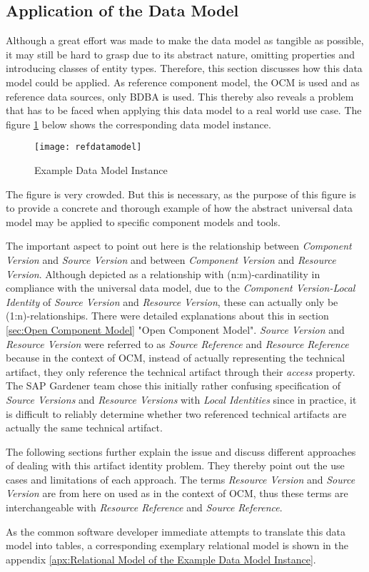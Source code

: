 \subsection{Application of the Data Model} \label{sec:Application of the Data Model}
Although a great effort was made to make the data model as tangible as possible, it may still be hard to grasp due to its abstract nature, omitting properties and introducing classes of entity types. Therefore, this section discusses how this data model could be applied. As reference component model, the OCM is used and as reference data sources, only BDBA is used. This thereby also reveals a problem that has to be faced when applying this data model to a real world use case. The figure \ref{fig:RefDataModel} below shows the corresponding data model instance.\par

\begin{figure}[H]
	\centering
	\texttt{[image: refdatamodel]}
	\caption[Data Model]{Example Data Model Instance }
	\label{fig:RefDataModel}
\end{figure}

The figure is very crowded. But this is necessary, as the purpose of this figure is to provide a concrete and thorough example of how the abstract universal data model may be applied to specific component models and tools.\par
The important aspect to point out here is the relationship between \emph{Component Version} and \emph{Source Version} and between \emph{Component Version} and \emph{Resource Version}. Although depicted as a relationship with (n:m)-cardinatility in compliance with the universal data model, due to the \emph{Component Version-Local Identity} of \emph{Source Version} and \emph{Resource Version}, these can actually only be (1:n)-relationships. There were detailed explanations about this in section \ref{sec:Open Component Model} "Open Component Model". \emph{Source Version} and \emph{Resource Version} were referred to as \emph{Source Reference} and \emph{Resource Reference} because in the context of OCM, instead of actually representing the technical artifact, they only reference the technical artifact through their \emph{access} property. The SAP Gardener team chose this initially rather confusing specification of \emph{Source Versions} and \emph{Resource Versions} with \emph{Local Identities} since in practice, it is difficult to reliably determine whether two referenced technical artifacts are actually the same technical artifact.\par 
The following sections further explain the issue and discuss different approaches of dealing with this artifact identity problem. They thereby point out the use cases and limitations of each approach. The terms \emph{Resource Version} and \emph{Source Version} are from here on used as in the context of OCM, thus these terms are interchangeable with \emph{Resource Reference} and \emph{Source Reference}.\par 
As the common software developer immediate attempts to translate this data model into tables, a corresponding exemplary relational model is shown in the appendix \ref{apx:Relational Model of the Example Data Model Instance}.  

